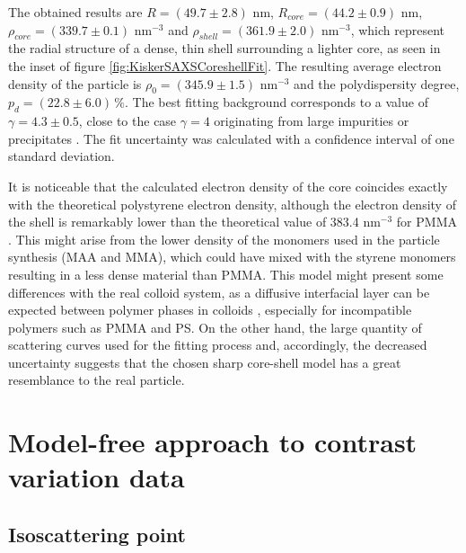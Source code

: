 The obtained results are \(R=\left(49.7 \pm 2.8\right) \) nm, \(R_{core}=\left(44.2 \pm 0.9\right) \) nm, \(\rho_{core}=\left(339.7 \pm 0.1\right)\) nm\(^{-3}\) and \(\rho_{shell}=\left(361.9 \pm 2.0\right)\) nm\(^{-3}\), which represent the radial structure of a dense, thin shell surrounding a lighter core, as seen in the inset of figure \ref{fig:KiskerSAXSCoreshellFit}. The resulting average electron density of the particle is \(\rho_{0}=\left(345.9 \pm 1.5\right)\) nm\(^{-3}\) and the polydispersity degree, \(p_d=\left(22.8\pm 6.0\right)\,\%\). The best fitting background corresponds to a value of \( \gamma = 4.3\pm 0.5 \), close to the case \( \gamma = 4 \) originating from large impurities or precipitates \citet{pedersen_determination_1994}. The fit uncertainty was calculated with a confidence interval of one standard deviation. 

It is noticeable that the calculated electron density of the core coincides exactly with the theoretical polystyrene electron density, although the electron density of the shell is remarkably lower than the theoretical value of 383.4 nm\(^{-3}\) for PMMA \citet{ballauff_saxs_2001-1}. This might arise from the lower density of the monomers used in the particle synthesis (MAA and MMA), which could have mixed with the styrene monomers resulting in a less dense material than PMMA. This model might present some differences with the real colloid system, as a diffusive interfacial layer can be expected between polymer phases in colloids \citet{dingenouts_interface_1994}, especially for incompatible polymers such as PMMA and PS. On the other hand, the large quantity of scattering curves used for the fitting process and, accordingly, the decreased uncertainty suggests that the chosen sharp core-shell model has a great resemblance to the real particle.

\section{Model-free approach to contrast variation data}
\subsection{Isoscattering point}
